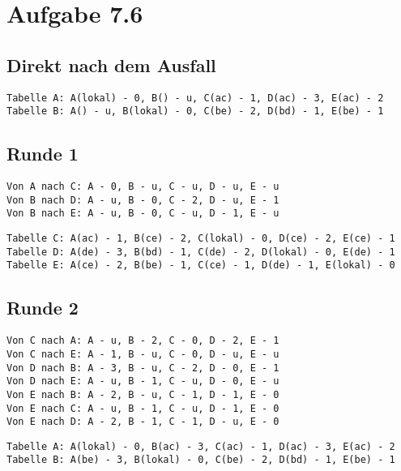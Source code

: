 \documentclass[10pt,a4paper]{article}
\begin{document}
\section{Aufgabe 7.6}

\subsection{Direkt nach dem Ausfall}

\begin{verbatim}
Tabelle A: A(lokal) - 0, B() - u, C(ac) - 1, D(ac) - 3, E(ac) - 2
Tabelle B: A() - u, B(lokal) - 0, C(be) - 2, D(bd) - 1, E(be) - 1
\end{verbatim}

\subsection{Runde 1}

\begin{verbatim}
Von A nach C: A - 0, B - u, C - u, D - u, E - u
Von B nach D: A - u, B - 0, C - 2, D - u, E - 1
Von B nach E: A - u, B - 0, C - u, D - 1, E - u
\end{verbatim}

\begin{verbatim}
Tabelle C: A(ac) - 1, B(ce) - 2, C(lokal) - 0, D(ce) - 2, E(ce) - 1
Tabelle D: A(de) - 3, B(bd) - 1, C(de) - 2, D(lokal) - 0, E(de) - 1
Tabelle E: A(ce) - 2, B(be) - 1, C(ce) - 1, D(de) - 1, E(lokal) - 0
\end{verbatim}

\subsection{Runde 2}

\begin{verbatim}
Von C nach A: A - u, B - 2, C - 0, D - 2, E - 1
Von C nach E: A - 1, B - u, C - 0, D - u, E - u
Von D nach B: A - 3, B - u, C - 2, D - 0, E - 1
Von D nach E: A - u, B - 1, C - u, D - 0, E - u
Von E nach B: A - 2, B - u, C - 1, D - 1, E - 0
Von E nach C: A - u, B - 1, C - u, D - 1, E - 0
Von E nach D: A - 2, B - 1, C - 1, D - u, E - 0
\end{verbatim}

\begin{verbatim}
Tabelle A: A(lokal) - 0, B(ac) - 3, C(ac) - 1, D(ac) - 3, E(ac) - 2
Tabelle B: A(be) - 3, B(lokal) - 0, C(be) - 2, D(bd) - 1, E(be) - 1
\end{verbatim}
\end{document}
